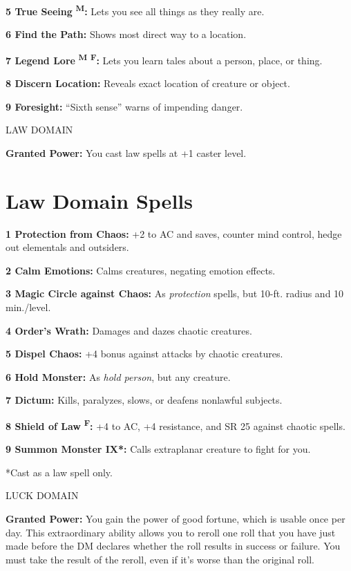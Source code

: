 \documentclass{article}
\begin{document}
\textbf{5 True Seeing }\textsuperscript{\textbf{M}}\textbf{: }Lets you see all 
things as they really are.

\textbf{6 Find the Path: }Shows most direct way to a location.

\textbf{7 Legend Lore }\textsuperscript{\textbf{M}}{\scriptsize{}\textbf{ }}\textsuperscript{\textbf{F}}\textbf{: 
}Lets you learn tales about a person, place, or thing.

\textbf{8 Discern Location: }Reveals exact location of creature or object.

\textbf{9 Foresight: }``Sixth sense'' warns of impending danger.

\vspace{12pt}
LAW DOMAIN

\textbf{Granted Power:} You cast law spells at +1 caster level.

\section*{\textbf{Law Domain Spells}}

\textbf{1 Protection from Chaos: }+2 to AC and saves, counter mind control, hedge 
out elementals and outsiders.

\textbf{2 Calm Emotions:} Calms creatures, negating emotion effects.

\textbf{3 Magic Circle against Chaos:} As \textit{protection }spells, but 10-ft. 
radius and 10 min./level.

\textbf{4 Order's Wrath: }Damages and dazes chaotic creatures.

\textbf{5 Dispel Chaos: }+4 bonus against attacks by chaotic creatures.

\textbf{6 Hold Monster: }As \textit{hold person}, but any creature.

\textbf{7 Dictum:} Kills, paralyzes, slows, or deafens nonlawful subjects.

\textbf{8 Shield of Law }\textsuperscript{\textbf{F}}\textbf{: }+4 to AC, +4 resistance, 
and SR 25 against chaotic spells.

\textbf{9 Summon Monster IX*: }Calls extraplanar creature to fight for you.

*Cast as a law spell only.

\vspace{12pt}
LUCK DOMAIN

\textbf{Granted Power:} You gain the power of good fortune, which is usable once 
per day. This extraordinary ability allows you to reroll one roll that you have 
just made before the DM declares whether the roll results in success or failure. 
You must take the result of the reroll, even if it's worse than the original roll.
\end{document}
